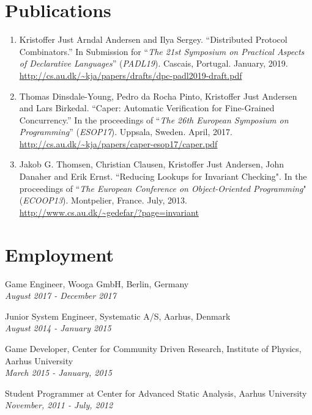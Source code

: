 \documentclass[10pt,letterpaper]{article}
\renewenvironment{itemize}{
  \begin{list}{}{
    \setlength{\leftmargin}{1.5em}
    \setlength{\itemsep}{0.25em}
    \setlength{\parskip}{0pt}
    \setlength{\parsep}{0.25em}
  }
}{
  \end{list}
}
\begin{document}
\section*{Publications}

\begin{enumerate}
\item Kristoffer Just Arndal Andersen and Ilya Sergey. ``Distributed Protocol Combinators.''
In Submission for ``\emph{The 21st Symposium on Practical Aspects of Declarative Languages}'' (\emph{PADL19}). Cascais, Portugal. January, 2019.\\
\url{http://cs.au.dk/~kja/papers/drafts/dpc-padl2019-draft.pdf}
\item Thomas Dinsdale-Young, Pedro da Rocha Pinto, Kristoffer Just Andersen and
  Lars Birkedal. ``Caper: Automatic Verification for Fine-Grained Concurrency.''
  In the proceedings of ``\emph{The 26th European Symposium on
    Programming}'' (\emph{ESOP17}). Uppsala, Sweden. April, 2017.\\
  \url{http://cs.au.dk/~kja/papers/caper-esop17/caper.pdf}
	\item Jakob G. Thomsen, Christian Clausen, Kristoffer Just Andersen, John Danaher and Erik Ernst. ``Reducing Lookups for Invariant Checking". In the proceedings of ``\emph{The European Conference on Object-Oriented Programming}" (\emph{ECOOP13}). Montpelier, France. July, 2013.\\
          \url{http://www.cs.au.dk/~gedefar/?page=invariant}
\end{enumerate}

\section*{Employment}

\begin{itemize}
\item Game Engineer, Wooga GmbH, Berlin, Germany\\
  \emph{August 2017 - December 2017}
\item Junior System Engineer, Systematic A/S, Aarhus, Denmark\\
  \emph{August 2014 - January 2015}
\item Game Developer, Center for Community Driven Research, Institute of
  Physics, Aarhus University\\
  \emph{March 2015 - January, 2015}
\item Student Programmer at Center for Advanced Static Analysis, Aarhus University\\
	\emph{November, 2011 - July, 2012}
\end{itemize}
\end{document}
